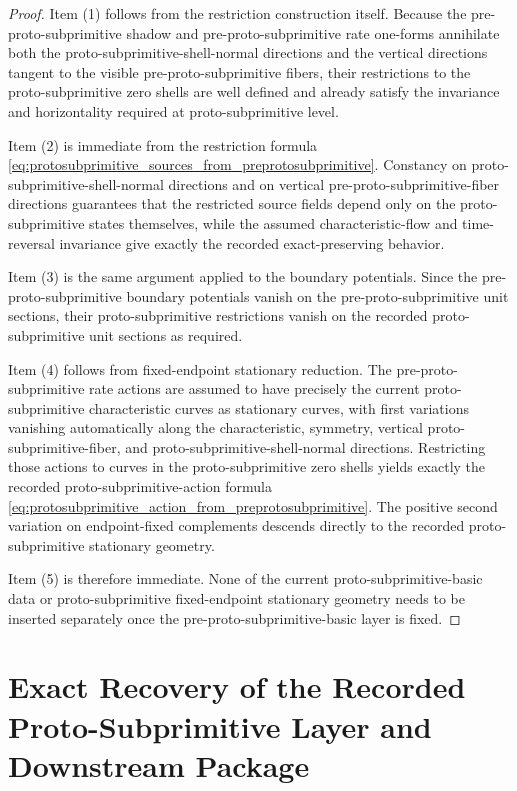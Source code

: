 \documentclass[11pt]{article}
\begin{document}
\begin{proof}
Item (1) follows from the restriction construction itself. Because the pre-proto-subprimitive shadow and pre-proto-subprimitive rate one-forms annihilate both the proto-subprimitive-shell-normal directions and the vertical directions tangent to the visible pre-proto-subprimitive fibers, their restrictions to the proto-subprimitive zero shells are well defined and already satisfy the invariance and horizontality required at proto-subprimitive level.

Item (2) is immediate from the restriction formula \eqref{eq:protosubprimitive_sources_from_preprotosubprimitive}. Constancy on proto-subprimitive-shell-normal directions and on vertical pre-proto-subprimitive-fiber directions guarantees that the restricted source fields depend only on the proto-subprimitive states themselves, while the assumed characteristic-flow and time-reversal invariance give exactly the recorded exact-preserving behavior.

Item (3) is the same argument applied to the boundary potentials. Since the pre-proto-subprimitive boundary potentials vanish on the pre-proto-subprimitive unit sections, their proto-subprimitive restrictions vanish on the recorded proto-subprimitive unit sections as required.

Item (4) follows from fixed-endpoint stationary reduction. The pre-proto-subprimitive rate actions are assumed to have precisely the current proto-subprimitive characteristic curves as stationary curves, with first variations vanishing automatically along the characteristic, symmetry, vertical proto-subprimitive-fiber, and proto-subprimitive-shell-normal directions. Restricting those actions to curves in the proto-subprimitive zero shells yields exactly the recorded proto-subprimitive-action formula \eqref{eq:protosubprimitive_action_from_preprotosubprimitive}. The positive second variation on endpoint-fixed complements descends directly to the recorded proto-subprimitive stationary geometry.

Item (5) is therefore immediate. None of the current proto-subprimitive-basic data or proto-subprimitive fixed-endpoint stationary geometry needs to be inserted separately once the pre-proto-subprimitive-basic layer is fixed.
\end{proof}

\section{Exact Recovery of the Recorded Proto-Subprimitive Layer and Downstream Package}
\end{document}
